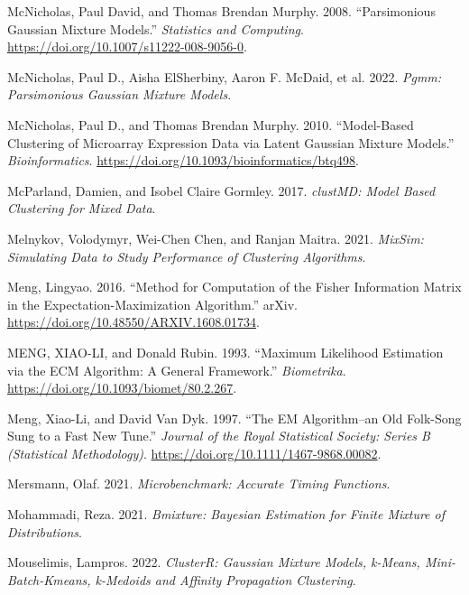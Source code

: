 \begin{CSLReferences}{1}{0}
\leavevmode{}%
McNicholas, Paul David, and Thomas Brendan Murphy. 2008. {``Parsimonious Gaussian Mixture Models.''} \emph{Statistics and Computing}. \url{https://doi.org/10.1007/s11222-008-9056-0}.

\leavevmode{}%
McNicholas, Paul D., Aisha ElSherbiny, Aaron F. McDaid, et al. 2022. \emph{Pgmm: Parsimonious Gaussian Mixture Models}.

\leavevmode{}%
McNicholas, Paul D., and Thomas Brendan Murphy. 2010. {``Model-Based Clustering of Microarray Expression Data via Latent Gaussian Mixture Models.''} \emph{Bioinformatics}. \url{https://doi.org/10.1093/bioinformatics/btq498}.

\leavevmode{}%
McParland, Damien, and Isobel Claire Gormley. 2017. \emph{clustMD: Model Based Clustering for Mixed Data}.

\leavevmode{}%
Melnykov, Volodymyr, Wei-Chen Chen, and Ranjan Maitra. 2021. \emph{MixSim: Simulating Data to Study Performance of Clustering Algorithms}.

\leavevmode{}%
Meng, Lingyao. 2016. {``Method for Computation of the Fisher Information Matrix in the Expectation-Maximization Algorithm.''} arXiv. \url{https://doi.org/10.48550/ARXIV.1608.01734}.

\leavevmode{}%
MENG, XIAO-LI, and Donald Rubin. 1993. {``Maximum {Likelihood Estimation} via the {ECM Algorithm}: {A General Framework}.''} \emph{Biometrika}. \url{https://doi.org/10.1093/biomet/80.2.267}.

\leavevmode{}%
Meng, Xiao-Li, and David Van Dyk. 1997. {``The {EM} {Algorithm}--an {Old} {Folk}-Song {Sung} to a {Fast} {New} {Tune}.''} \emph{Journal of the Royal Statistical Society: Series B (Statistical Methodology)}. \url{https://doi.org/10.1111/1467-9868.00082}.

\leavevmode{}%
Mersmann, Olaf. 2021. \emph{Microbenchmark: Accurate Timing Functions}.

\leavevmode{}%
Mohammadi, Reza. 2021. \emph{Bmixture: Bayesian Estimation for Finite Mixture of Distributions}.

\leavevmode{}%
Mouselimis, Lampros. 2022. \emph{ClusterR: Gaussian Mixture Models, k-Means, Mini-Batch-Kmeans, k-Medoids and Affinity Propagation Clustering}.


\end{CSLReferences}
